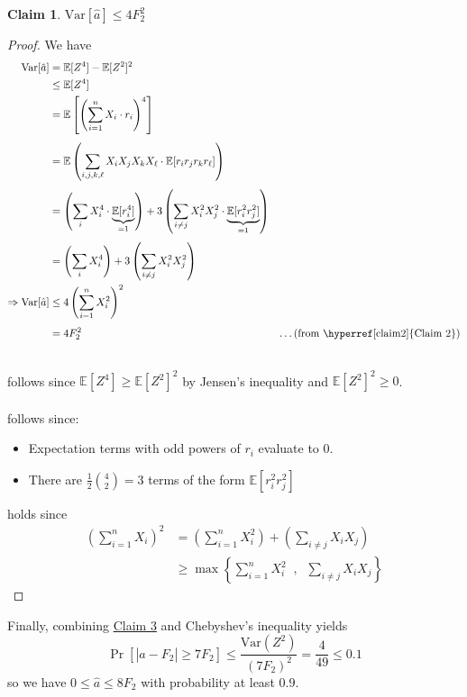 \documentclass[11pt]{article}
\makeatletter
\newtheorem{claim}{Claim}
\newcommand{\Expect}{\mathbb{E}}
\newcommand{\Var}{\mathrm{Var}}
\newcommand{\abs}[1]{\left| #1 \right|}
\renewcommand*{\eqref}[1]{%
	\hyperref[{#1}]{\textup{\tagform@{\ref*{#1}}}}%
}
\makeatother
\begin{document}
\begin{claim} \label{claim3}
	$\Var [\hat{a}] \leq 4F_2^2$
\end{claim}
\begin{proof}
We have
\begin{align}
\Var[\hat{a}] &= \Expect[Z^4] - \Expect[Z^2]^2 \nonumber \\ 
&\leq \Expect[Z^4] \label{eq1} \\
&= \Expect \left[ \left( \sum_{i=1}^{n}  X_i \cdot r_i \right)^4 \right] \nonumber \\[4pt]
&= \Expect \left( \sum_{i, j, k, \ell} X_i X_j X_k X_\ell \cdot \Expect [r_ir_jr_kr_\ell] \right) \nonumber \\[4pt]
&= \left(\sum_i X_i^4 \cdot \underbrace{\Expect[r_i^4]}_{=1}\right) + 3 \left( \sum_{i \neq j} X_i^2 X_j^2 \cdot \underbrace{\Expect[r_i^2 r_j^2]}_{=1} \right) \label{eq2} \\[4pt]
&= \left(\sum_i X_i^4 \right) + 3 \left(\sum_{i \neq j} X_i^2 X_j^2\right) \nonumber \\
\Rightarrow \Var[\hat{a}] &\leq 4 \left(\sum_{i=1}^{n} X_i^2\right)^2 \label{eq3} \\[4pt]
&= 4F_2^2 & \textrm{\dots (from \hyperref[claim2]{Claim 2})} \nonumber \\
\nonumber
\end{align}

\noindent \eqref{eq1} follows since $\Expect[Z^4] \geq \Expect[Z^2]^2$ by Jensen's inequality and $\Expect[Z^2]^2 \geq 0$. \\ \\
\noindent \eqref{eq2} follows since: 
\begin{itemize}
	\item Expectation terms with odd powers of $r_i$ evaluate to $0$.
	\item There are $\frac{1}{2} \binom{4}{2} = 3$ terms of the form $\Expect[r_i^2 r_j^2]$
\end{itemize}
\noindent \eqref{eq3} holds since 
\begin{align*}
\left(\sum_{i=1}^{n} X_i\right)^2 &= \left(\sum_{i=1}^{n} X_i^2 \right) + \left(\sum_{i \neq j} X_i X_j \right) \\[3pt]
&\geq \max \left\{ \sum_{i=1}^{n} X_i^2 \;\; , \;\; \sum_{i \neq j} X_i X_j \right\}
\end{align*}
\end{proof}

\noindent Finally, combining \hyperref[claim3]{Claim 3} and Chebyshev's inequality yields
\[
	\Pr \left[ \abs{\hat{a} - F_2} \geq 7F_2 \right] \leq \frac{\Var(Z^2)}{(7F_2)^2} = \frac{4}{49} \leq 0.1
\]
so we have $0 \leq \hat{a} \leq 8F_2$ with probability at least $0.9$. \\ \\
\end{document}
